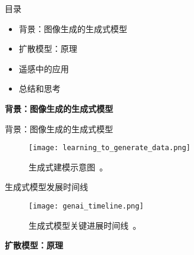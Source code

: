 
\begin{frame}{\LARGE 目录}
  \begin{itemize}
    \item {\Large 背景：图像生成的生成式模型}
    \item {\Large 扩散模型：原理}
    \item {\Large 遥感中的应用}
    \item {\Large 总结和思考}
  \end{itemize}
\end{frame}


\begin{refsection}
  \begin{frame}
    \centering
    \vspace{2.5cm}
    {\LARGE \textbf{背景：图像生成的生成式模型}}
  \end{frame}
\end{refsection}

\begin{refsection}
  \begin{frame}{背景：图像生成的生成式模型}
    \begin{figure}
      \centering
      \texttt{[image: learning\_to\_generate\_data.png]}
      \caption{\scriptsize 生成式建模示意图~\parencite{CVPR2023Tutorial}。}
    \end{figure}
    
    \bottomleftrefs
  \end{frame}
\end{refsection}

\begin{refsection}
  \begin{frame}{生成式模型发展时间线}
    \begin{figure}
      \centering
      \texttt{[image: genai\_timeline.png]}
      \caption{\scriptsize 生成式模型关键进展时间线~\parencite{dengPPTAdvancedNueralNetwork2024}。}
    \end{figure}
    \bottomleftrefs
  \end{frame}
  \end{refsection}



\begin{refsection}
  \begin{frame}
    \centering
    \vspace{2.5cm}
    {\LARGE \textbf{扩散模型：原理}}
  \end{frame}
\end{refsection}

